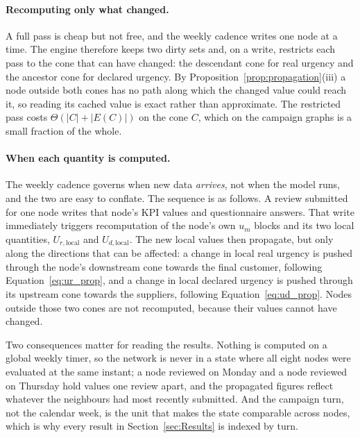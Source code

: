\paragraph{Recomputing only what changed.}
A full pass is cheap but not free, and the weekly cadence writes one node at a time. The
engine therefore keeps two dirty sets and, on a write, restricts each pass to the cone that
can have changed: the descendant cone for real urgency and the ancestor cone for declared
urgency. By Proposition~\ref{prop:propagation}(iii) a node outside both cones has no path
along which the changed value could reach it, so reading its cached value is exact rather
than approximate. The restricted pass costs $\Theta(|C| + |E(C)|)$ on the cone $C$, which on
the campaign graphs is a small fraction of the whole.

\paragraph{When each quantity is computed.}
The weekly cadence governs when new data \emph{arrives}, not when the model runs, and the
two are easy to conflate. The sequence is as follows. A review submitted for one node writes
that node's KPI values and questionnaire answers. That write immediately triggers
recomputation of the node's own $u_m$ blocks and its two local quantities,
$U_{r,\text{local}}$ and $U_{d,\text{local}}$. The new local values then propagate, but only
along the directions that can be affected: a change in local real urgency is pushed through
the node's downstream cone towards the final customer, following
Equation~\ref{eq:ur_prop}, and a change in local declared urgency is pushed through its
upstream cone towards the suppliers, following Equation~\ref{eq:ud_prop}. Nodes outside those
two cones are not recomputed, because their values cannot have changed.

Two consequences matter for reading the results. Nothing is computed on a global weekly
timer, so the network is never in a state where all eight nodes were evaluated at the same
instant; a node reviewed on Monday and a node reviewed on Thursday hold values one review
apart, and the propagated figures reflect whatever the neighbours had most recently
submitted. And the campaign turn, not the calendar week, is the unit that makes the state
comparable across nodes, which is why every result in Section~\ref{sec:Results} is indexed by
turn.

